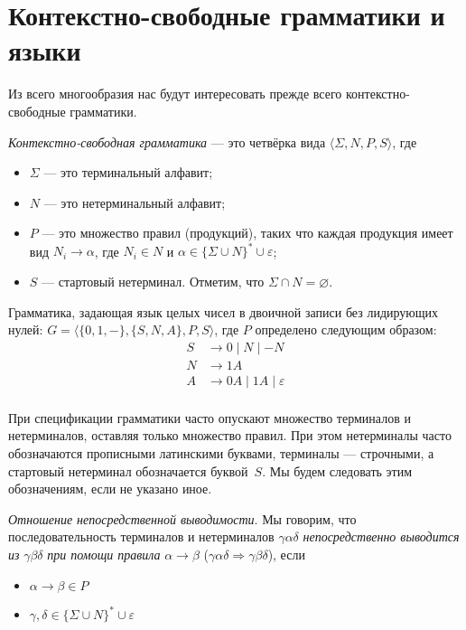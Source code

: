 \chapter{Контекстно-свободные грамматики и языки}\label{CFG}

Из всего многообразия нас будут интересовать прежде всего контекстно-свободные грамматики.

\begin{definition}
\textit{Контекстно-свободная грамматика} --- это четвёрка вида $\langle \Sigma, N, P, S \rangle$, где
\begin{itemize}
  \item $\Sigma$ --- это терминальный алфавит;
  \item $N$ --- это нетерминальный алфавит;
  \item $P$ --- это множество правил (продукций), таких что каждая продукция имеет вид $N_i \to \alpha$, где $N_i \in N$ и $\alpha \in \{\Sigma \cup N\}^* \cup {\varepsilon}$;
  \item $S$ --- стартовый нетерминал.
  Отметим, что $\Sigma \cap N = \varnothing$.
\end{itemize}
\end{definition}

\begin{example}
Грамматика, задающая язык целых чисел в двоичной записи без лидирующих нулей: $G = \langle \{0, 1, -\}, \{S, N, A\}, P, S \rangle$, где $P$ определено следующим образом:
\begin{align*}
  S & \rightarrow 0 \mid N \mid - N  \\
  N & \rightarrow 1 A \\
  A & \rightarrow 0 A \mid 1 A  \mid \varepsilon\\
\end{align*}
\end{example}
При спецификации грамматики часто опускают множество терминалов и нетерминалов, оставляя только множество правил. При этом нетерминалы часто обозначаются прописными латинскими буквами, терминалы --- строчными, а стартовый нетерминал обозначается буквой~$S$. Мы будем следовать этим обозначениям, если не указано иное.


\begin{definition}\label{def derivability in CFG}
  \textit{Отношение непосредственной выводимости}. Мы говорим, что последовательность терминалов и нетерминалов $\gamma \alpha \delta$ \textit{непосредственно выводится из} $\gamma \beta \delta$ \textit{при помощи правила} $\alpha \rightarrow \beta$ ($\gamma \alpha \delta \Rightarrow \gamma \beta \delta$), если
  \begin{itemize}
    \item $\alpha \rightarrow \beta \in P$
    \item $\gamma, \delta \in \{\Sigma \cup N\}^* \cup {\varepsilon}$
  \end{itemize}
\end{definition}

